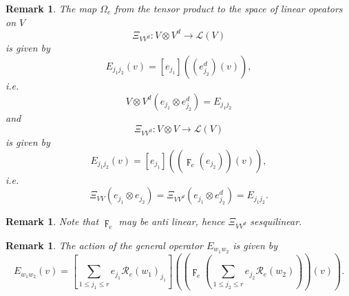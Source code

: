\documentclass[aps,preprint]{revtex4}%
\newtheorem{remark}[theorem]{Remark}
\begin{document}
\begin{remark}
The map $\Omega_{e}$ from the tensor product to the space of linear opeators
on $V$
\begin{equation}
\Xi_{VV^{d}}:V\otimes V^{d}\rightarrow\mathcal{L}\left(  V\right)
\end{equation}
is given by
\begin{equation}
E_{j_{1}j_{2}}\left(  v\right)  =\left[  \overset{}{e_{j_{1}}}\right]  \left(
\overset{}{\left(  e_{j_{2}}^{d}\right)  }\left(  v\right)  \right)  ,
\end{equation}
i.e.
\begin{equation}
V\otimes V^{d}\left(  e_{j_{1}}\otimes e_{j_{2}}^{d}\right)  =E_{j_{1}j_{2}}%
\end{equation}
and
\begin{equation}
\Xi_{VV^{d}}:V\otimes V\rightarrow\mathcal{L}\left(  V\right)
\end{equation}
is given by
\begin{equation}
E_{j_{1}j_{2}}\left(  v\right)  =\left[  \overset{}{e_{j_{1}}}\right]  \left(
\left(  \overset{}{\digamma_{e}\left(  e_{j_{2}}\right)  }\right)  \left(
v\right)  \right)  ,
\end{equation}
i.e.
\begin{equation}
\Xi_{VV}\left(  e_{j_{1}}\otimes e_{j_{2}}\right)  =\Xi_{VV^{d}}\left(
e_{j_{1}}\otimes e_{j_{2}}^{d}\right)  =E_{j_{1}j_{2}}.
\end{equation}

\end{remark}

\begin{remark}
Note that $\digamma_{e}$ may be anti linear, hence $\Xi_{VV^{d}}$ sesquilinear.
\end{remark}

\begin{remark}
The action of the general operator $E_{w_{1}w_{2}}$ is given by
\begin{equation}
E_{w_{1}w_{2}}\left(  v\right)  =\left[  \sum_{1\leq j_{1}\leq r}%
\overset{}{e_{j_{1}}}\mathcal{R}_{e}\left(  w_{1}\right)  _{j_{1}}\right]
\left(  \left(  \overset{}{\digamma_{e}\left(  \sum_{1\leq j_{2}\leq
r}e_{j_{2}}\mathcal{R}_{e}\left(  w_{2}\right)  \right)  }\right)  \left(
v\right)  \right)  .
\end{equation}

\end{remark}
\end{document}
